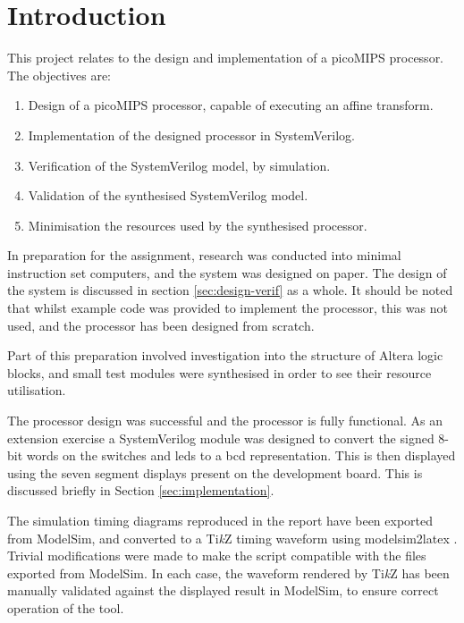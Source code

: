 \section{Introduction} \label{sec:intro}

This project relates to the design and implementation of a picoMIPS processor. The objectives are:
\begin{enumerate}
	\item Design of a picoMIPS processor, capable of executing an affine transform. \label{obj:design}
	\item Implementation of the designed processor in SystemVerilog. \label{obj:imp}
	\item Verification of the SystemVerilog model, by simulation. \label{obj:verif}
	\item Validation of the synthesised SystemVerilog model. \label{obj:valid}
	\item Minimisation the resources used by the synthesised processor. \label{obj:minimal}
\end{enumerate}

In preparation for the assignment, research was conducted into minimal instruction set computers, and the system was designed on paper. The design of the system is discussed in section \ref{sec:design-verif} as a whole. It should be noted that whilst example code was provided to implement the processor, this was not used, and the processor has been designed from scratch.

Part of this preparation involved investigation into the structure of Altera logic blocks, and small test modules were synthesised in order to see their resource utilisation.

The processor design was successful and the processor is fully functional. As an extension exercise a SystemVerilog module was designed to convert the signed 8-bit words on the switches and \glspl{led} to a \gls{bcd} representation. This is then displayed using the seven segment displays present on the development board. This is discussed briefly in Section \ref{sec:implementation}.

The simulation timing diagrams reproduced in the report have been exported from ModelSim, and converted to a Ti\textit{k}Z timing waveform using modelsim2latex \cite{show2016}. Trivial modifications were made to make the script compatible with the files exported from ModelSim. In each case, the waveform rendered by Ti\textit{k}Z has been manually validated against the displayed result in ModelSim, to ensure correct operation of the tool.

